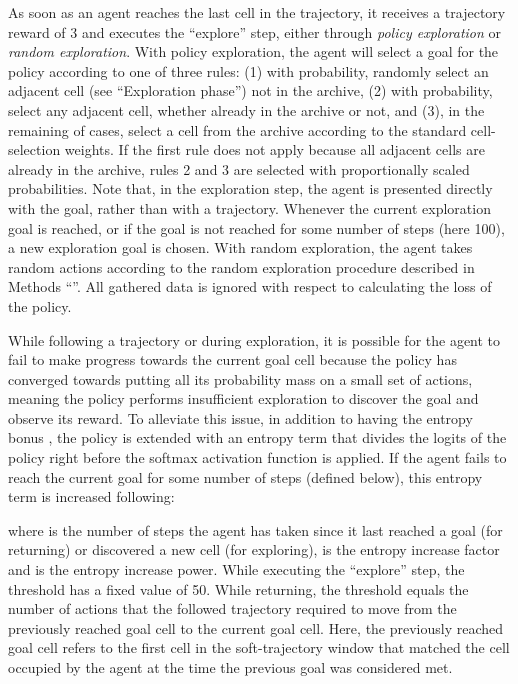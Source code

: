 \documentclass{nature}
\begin{document}
\begin{methods}
As soon as an agent reaches the last cell in the trajectory, it receives a trajectory reward  of 3 and executes the ``explore'' step, either through \emph{policy exploration} or \emph{random exploration}.
With policy exploration, the agent will select a goal for the policy according to one of three rules: (1) with  probability, randomly select an adjacent cell (see ``Exploration phase'') not in the archive, (2) with  probability, select any adjacent cell, whether already in the archive or not, and (3), in the remaining  of cases, select a cell from the archive according to the standard cell-selection weights.
If the first rule does not apply because all adjacent cells are already in the archive, rules 2 and 3 are selected with proportionally scaled probabilities.
Note that, in the exploration step, the agent is presented directly with the goal, rather than with a trajectory.
Whenever the current exploration goal is reached, or if the goal is not reached for some number of steps (here 100), a new exploration goal is chosen. 
With random exploration, the agent takes random actions according to the random exploration procedure described in Methods ``''.
All gathered data is ignored with respect to calculating the loss of the policy.

While following a trajectory or during exploration, it is possible for the agent to fail to make progress towards the current goal cell because the policy has converged towards putting all its probability mass on a small set of actions, meaning the policy performs insufficient exploration to discover the goal and observe its reward.
To alleviate this issue, in addition to having the entropy bonus , the policy is extended with an entropy term  that divides the logits of the policy right before the softmax activation function is applied.
If the agent fails to reach the current goal for some number of steps  (defined below), this entropy term is increased following:

where  is the number of steps the agent has taken since it last reached a goal (for returning) or discovered a new cell (for exploring),  is the entropy increase factor and  is the entropy increase power.
While executing the ``explore'' step, the threshold  has a fixed value of 50. 
While returning, the threshold  equals the number of actions that the followed trajectory required to move from the previously reached goal cell to the current goal cell.
Here, the previously reached goal cell refers to the first cell in the soft-trajectory window that matched the cell occupied by the agent at the time the previous goal was considered met.


\end{methods}
\end{document}
